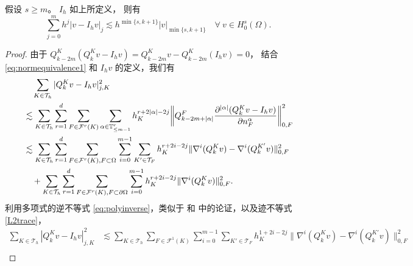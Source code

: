 \begin{lemma}
假设 $s\geq m$。
$I_h$ 如上所定义，
则有
\begin{equation}\label{eq:interpolationestimate}
\sum_{j=0}^mh^j|v-I_hv|_{j}\lesssim h^{\min\{s,k+1\}}|v|_{\min\{s,k+1\}}\quad\forall~v\in H_0^s(\Omega).
\end{equation}
\end{lemma}
\begin{proof}
由于 $Q_{k-2m}^K(Q_k^Kv-I_hv)=Q_{k-2m}^Kv-Q_{k-2m}^K(I_hv)=0$，
结合 \eqref{eq:normequivalence1} 和 $I_hv$ 的定义，我们有
\begin{align*}
&\quad\sum_{K\in\mathcal T_h}|Q_k^Kv-I_hv|_{j,K}^2\\%
&\lesssim \sum_{K\in\mathcal T_h}\sum_{r=1}^{d}\sum_{F\in\mathcal
F^{r}(K)}\sum_{\alpha\in \mathbb{T}^{r}_{\leq m-1}}h_K^{r+2|\alpha|-2j}\bigg\|Q_{k-2m+|\alpha|}^{F}\frac{\partial^{|\alpha|}(Q_k^Kv-I_hv)}{\partial \nnn_{F}^{\alpha}}\bigg\|_{0,F}^2 \\
&\lesssim \sum_{K\in\mathcal T_h}\sum_{r=1}^{d}\sum_{F\in\mathcal F^{r}(K), F\subset\Omega}\sum_{i=0}^{m-1}\sum_{K'\in\mathcal T_F}h_K^{r+2i-2j}\|\nabla^i(Q_k^Kv)-\nabla^i(Q_k^{K'}v)\|_{0,F}^2 \\
&\quad + \sum_{K\in\mathcal T_h}\sum_{r=1}^{d}\sum_{F\in\mathcal F^{r}(K), F\subset\partial\Omega}\sum_{i=0}^{m-1}h_K^{r+2i-2j}\|\nabla^i(Q_k^Kv)\|_{0,F}^2.
\end{align*}
利用多项式的逆不等式 \eqref{eq:polyinverse}，类似于 \cite[引理 3.3]{Wang2001} 和 \cite[引理 2.1]{BrennerWangZhao2004} 中的论证，以及迹不等式 \eqref{L2trace}，
\begin{align*}
\sum_{K\in\mathcal T_h}|Q_k^Kv-I_hv|_{j,K}^2&\lesssim  \sum_{K\in\mathcal T_h}\sum_{F\in\mathcal F^{1}(K)}\sum_{i=0}^{m-1}\sum_{K'\in\mathcal T_F}h_K^{1+2i-2j}\|\nabla^i(Q_k^Kv)-\nabla^i(Q_k^{K'}v)\|_{0,F}^2 \\

\end{align*}
\end{proof}
